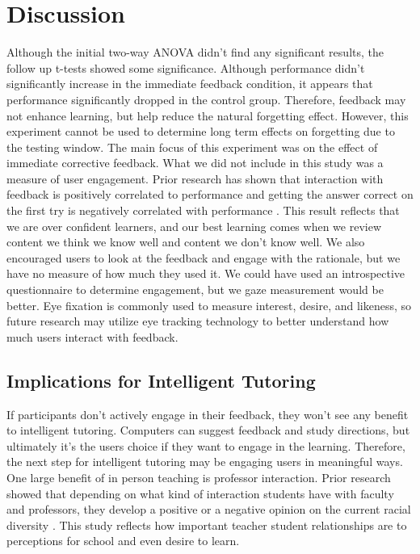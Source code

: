 \documentclass[acmtog]{acmart}
\begin{document}
\section{Discussion}
Although the initial two-way ANOVA didn't find any significant results, the follow up t-tests showed some significance. Although performance didn't significantly increase in the immediate feedback condition, it appears that performance significantly dropped in the control group. Therefore, feedback may not enhance learning, but help reduce the natural forgetting effect. However, this experiment cannot be used to determine long term effects on forgetting due to the testing window. The main focus of this experiment was on the effect of immediate corrective feedback. What we did not include in this study was a measure of user engagement. Prior research has shown that interaction with feedback is positively correlated to performance and getting the answer correct on the first try is negatively correlated with performance \cite{chen2018analyzing}. This result reflects that we are over confident learners, and our best learning comes when we review content we think we know well and content we don't know well. We also encouraged users to look at the feedback and engage with the rationale, but we have no measure of how much they used it. We could have used an introspective questionnaire to determine engagement, but we gaze measurement would be better. Eye fixation is commonly used to measure interest, desire, and likeness, so future research may utilize eye tracking technology to better understand how much users interact with feedback.

\subsection{Implications for Intelligent Tutoring}
If participants don't actively engage in their feedback, they won't see any benefit to intelligent tutoring. Computers can suggest feedback and study directions, but ultimately it's the users choice if they want to engage in the learning. Therefore, the next step for intelligent tutoring may be engaging users in meaningful ways. One large benefit of in person teaching is professor interaction. Prior research showed that depending on what kind of interaction students have with faculty and professors, they develop a positive or a negative opinion on the current racial diversity \cite{parker2020student}. This study reflects how important teacher student relationships are to perceptions for school and even desire to learn.
\end{document}
